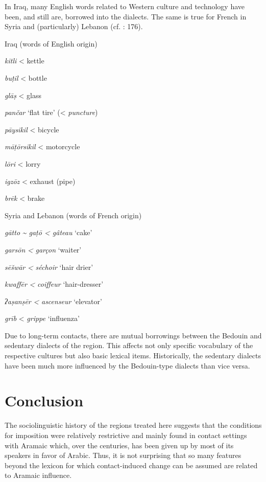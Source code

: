 \documentclass[output=paper]{langsci/langscibook}
\begin{document}
In Iraq, many English words related to Western culture and technology have been, and still are, borrowed into the dialects. The same is true for French in Syria and (particularly) Lebanon (cf. \citealt{Barbot1961}: 176).

\ea
Iraq (words of English origin)

\textit{kitli} < kettle 

\textit{buṭil} < bottle

\textit{glāṣ} < glass

\textit{pančar} ‘flat tire’ (< \textit{puncture})

\textit{pāysikil} < bicycle

\textit{māṭōrsikil} < motorcycle

\textit{lōri} < lorry 

\textit{igzōz} < exhaust (pipe)

\textit{brēk} < brake
\z

\ea
Syria and Lebanon (words of French origin)

\textit{gātto} \textit{{\textasciitilde} gaṭō < gâteau} ‘cake’

\textit{garsōn} \textit{<} \textit{garçon} ‘waiter’

\textit{sēšwār} \textit{<} \textit{séchoir} ‘hair drier’

\textit{kwaffēr} \textit{<} \textit{coiffeur} ‘hair-dresser’

\textit{ʔaṣanṣēr} \textit{<} \textit{ascenseur} ‘elevator’

\textit{grīb} < \textit{grippe} ‘influenza’
\z

Due to long-term contacts, there are mutual borrowings between the Bedouin and sedentary dialects of the region. This affects not only specific vocabulary of the respective cultures but also basic lexical items. Historically, the sedentary dialects have been much more influenced by the Bedouin-type dialects than vice versa. 

\section{Conclusion} 

The sociolinguistic history of the regions treated here suggests that the conditions for imposition were relatively restrictive and mainly found in contact settings with Aramaic which, over the centuries, has been given up by most of its speakers in favor of Arabic. Thus, it is not surprising that so many features beyond the lexicon for which contact-induced change can be assumed are related to Aramaic influence. 
\end{document}
